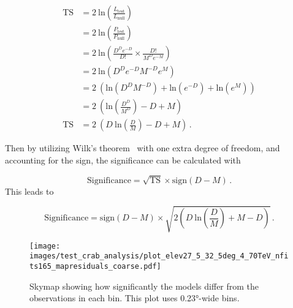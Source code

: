   \begin{equation}
    \begin{split}
      \textrm{TS} & = 2 \: \textrm{ln} \left ( \frac{ L_{\textrm{test}} }{ L_{\textrm{null}}    } \right ) \\
                  & = 2 \: \textrm{ln} \left ( \frac{ P_{\textrm{test}} }{ P_{\textrm{null}}    } \right ) \\
                  & = 2 \: \textrm{ln} \left ( \frac{D^D e^{-D}}{D!} \times \frac{D!}{M^D e^{-M}} \right ) \\
                  & = 2 \: \textrm{ln} \left ( D^D e^{-D} M^{-D} e^M                              \right ) \\
                  & = 2 \: \left (      \textrm{ln} \left ( D^D M^{-D} \right ) + \textrm{ln} \left ( e^{-D} \right ) + \textrm{ln} \left ( e^M  \right )\right ) \\
                  & = 2 \: \left (      \textrm{ln} \left (  \frac{D^D}{M^D} \right ) -D + M \right ) \\
      \textrm{TS} & = 2 \: \left ( D \: \textrm{ln} \left (  \frac{D  }{M  } \right ) -D + M \right ) \,.
    \end{split}
  \end{equation}
  
  Then by utilizing Wilk's theorem~\cite{wilks1938} with one extra degree of freedom, and accounting for the sign, the significance can be calculated with
    
  \begin{equation}
    \textrm{Significance} = \sqrt{\textrm{TS}} \times \textrm{sign} \left ( D - M \right ) \,.
  \end{equation}
  This leads to
  
  \begin{equation}\label{eqn:resmap_signif}
    \textrm{Significance} = \textrm{sign}(D-M) \times \sqrt{ 2 \left ( D \: \textrm{ln} \left ( \frac{D}{M} \right ) + M - D \right ) } \,.
  \end{equation}
  
  
  \begin{figure}[t]
    \centering
    \texttt{[image: images/test\_crab\_analysis/plot\_elev27\_5\_32\_5deg\_4\_70TeV\_nfits165\_mapresiduals\_coarse.pdf]}
    \caption[Crab Residual Skymap Coarse Binning]{
      Skymap showing how significantly the models differ from the observations in each bin.
      This plot uses \ang{0.23}-wide bins.}
    \label{fig:crab_signif_skymap_coarse}
  \end{figure}
  
